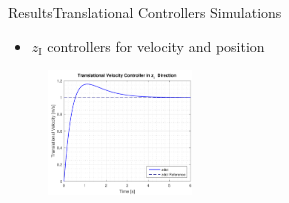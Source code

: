 \begin{frame}{Results}{Translational Controllers Simulations}
    \begin{itemize}
        \item $z_\mathrm{I}$ controllers for velocity and position
    \end{itemize}
    
        \begin{figure}[H]
            \centering
            \includegraphics[width=0.34\textwidth]{figures/zdotStep}  
        \end{figure} 
           

\end{frame}
